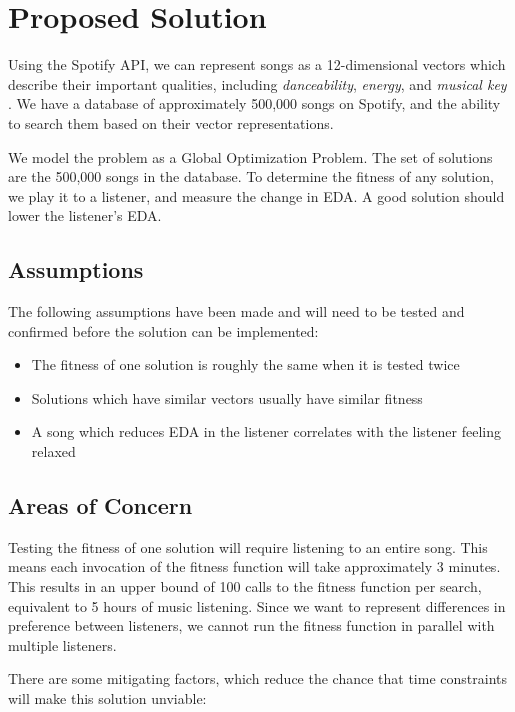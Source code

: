 \documentclass{article}
\begin{document}
	\section{Proposed Solution}
	Using the Spotify API, we can represent songs as a 12-dimensional vectors which describe their important qualities, including \emph{danceability}, \emph{energy}, and \emph{musical key} \cite{spotify_get_nodate, jehan_analyzer_2014}. We have a database of approximately 500,000 songs on Spotify, and the ability to search them based on their vector representations.
	
	We model the problem as a Global Optimization Problem. The set of solutions are the 500,000 songs in the database. To determine the fitness of any solution, we play it to a listener, and measure the change in EDA. A good solution should lower the listener's EDA.
	
	\subsection{Assumptions}
	The following assumptions have been made and will need to be tested and confirmed before the solution can be implemented:
	
	\begin{itemize}
		\item The fitness of one solution is roughly the same when it is tested twice
		\item Solutions which have similar vectors usually have similar fitness
		\item A song which reduces EDA in the listener correlates with the listener feeling relaxed
	\end{itemize}

	\subsection{Areas of Concern}
	Testing the fitness of one solution will require listening to an entire song. This means each invocation of the fitness function will take approximately 3 minutes. This results in an upper bound of 100 calls to  the fitness function per search, equivalent to 5 hours of music listening. Since we want to represent differences in preference between listeners, we cannot run the fitness function in parallel with multiple listeners.

	There are some mitigating factors, which reduce the chance that time constraints will make this solution unviable:
	
\end{document}
